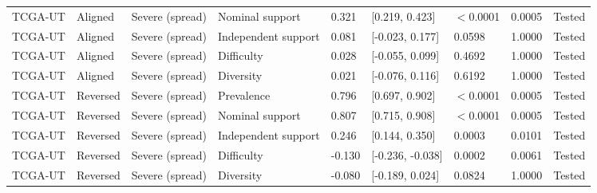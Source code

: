 \begin{longtable}{lllllllll}
TCGA-UT & Aligned & Severe (spread) & Nominal support & 0.321 & [0.219, 0.423] & $<$0.0001 & 0.0005 & Tested \\
TCGA-UT & Aligned & Severe (spread) & Independent support & 0.081 & [-0.023, 0.177] & 0.0598 & 1.0000 & Tested \\
TCGA-UT & Aligned & Severe (spread) & Difficulty & 0.028 & [-0.055, 0.099] & 0.4692 & 1.0000 & Tested \\
TCGA-UT & Aligned & Severe (spread) & Diversity & 0.021 & [-0.076, 0.116] & 0.6192 & 1.0000 & Tested \\
TCGA-UT & Reversed & Severe (spread) & Prevalence & 0.796 & [0.697, 0.902] & $<$0.0001 & 0.0005 & Tested \\
TCGA-UT & Reversed & Severe (spread) & Nominal support & 0.807 & [0.715, 0.908] & $<$0.0001 & 0.0005 & Tested \\
TCGA-UT & Reversed & Severe (spread) & Independent support & 0.246 & [0.144, 0.350] & 0.0003 & 0.0101 & Tested \\
TCGA-UT & Reversed & Severe (spread) & Difficulty & -0.130 & [-0.236, -0.038] & 0.0002 & 0.0061 & Tested \\
TCGA-UT & Reversed & Severe (spread) & Diversity & -0.080 & [-0.189, 0.024] & 0.0824 & 1.0000 & Tested \\
\end{longtable}
